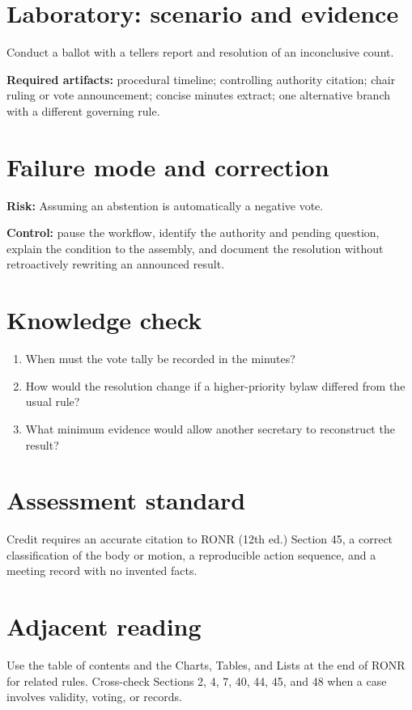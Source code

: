 \documentclass[11pt]{article}
\begin{document}
\section{Laboratory: scenario and evidence}
Conduct a ballot with a tellers report and resolution of an inconclusive count.

\textbf{Required artifacts:} procedural timeline; controlling authority citation; chair ruling or vote announcement; concise minutes extract; one alternative branch with a different governing rule.

\section{Failure mode and correction}
\textbf{Risk:} Assuming an abstention is automatically a negative vote.

\textbf{Control:} pause the workflow, identify the authority and pending question, explain the condition to the assembly, and document the resolution without retroactively rewriting an announced result.

\section{Knowledge check}
\begin{enumerate}[leftmargin=*,itemsep=4pt]
\item When must the vote tally be recorded in the minutes?
\item How would the resolution change if a higher-priority bylaw differed from the usual rule?
\item What minimum evidence would allow another secretary to reconstruct the result?
\end{enumerate}

\section{Assessment standard}
Credit requires an accurate citation to RONR (12th ed.) Section 45, a correct classification of the body or motion, a reproducible action sequence, and a meeting record with no invented facts.

\section{Adjacent reading}
Use the table of contents and the Charts, Tables, and Lists at the end of RONR for related rules. Cross-check Sections 2, 4, 7, 40, 44, 45, and 48 when a case involves validity, voting, or records.
\end{document}
